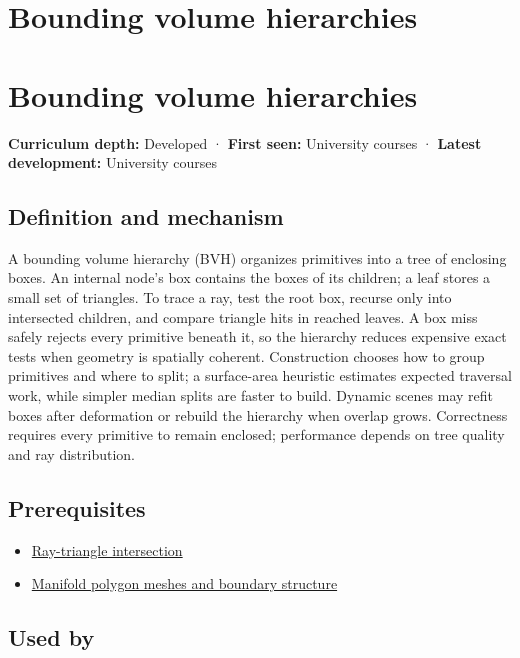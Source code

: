 \hypertarget{appendix-0b426c47dd78}{}
\section*{Bounding volume hierarchies}
\section{Bounding volume hierarchies}\label{appendix-0b426c47dd78-bounding-volume-hierarchies}

\textbf{Curriculum depth:} Developed · \textbf{First seen:} University courses · \textbf{Latest development:} University courses

\subsection{Definition and mechanism}\label{appendix-0b426c47dd78-definition-and-mechanism}

A bounding volume hierarchy (BVH) organizes primitives into a tree of enclosing boxes. An internal node's box contains the boxes of its children; a leaf stores a small set of triangles. To trace a ray, test the root box, recurse only into intersected children, and compare triangle hits in reached leaves. A box miss safely rejects every primitive beneath it, so the hierarchy reduces expensive exact tests when geometry is spatially coherent. Construction chooses how to group primitives and where to split; a surface-area heuristic estimates expected traversal work, while simpler median splits are faster to build. Dynamic scenes may refit boxes after deformation or rebuild the hierarchy when overlap grows. Correctness requires every primitive to remain enclosed; performance depends on tree quality and ray distribution.

\subsection{Prerequisites}\label{appendix-0b426c47dd78-prerequisites}

\begin{itemize}
\tightlist
\item
  \hyperref[appendix-47ac1bd6d144]{Ray-triangle intersection}
\item
  \hyperref[appendix-fab348609369]{Manifold polygon meshes and boundary structure}
\end{itemize}

\subsection{Used by}\label{appendix-0b426c47dd78-used-by}

